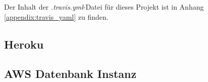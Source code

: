 Der Inhalt der \textit{.travis.yml}-Datei für dieses Projekt ist in Anhang \ref{appendix:travis_yaml} zu finden.


\subsection{Heroku}
\cite{Coutermarsh2014}
\subsection{AWS Datenbank Instanz}
\cite{Gaut2016}